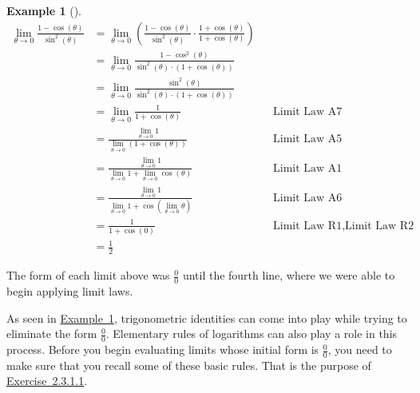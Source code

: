 \documentclass[12pt,]{book}
\theoremstyle{plain}
\theoremstyle{definition}
\theoremstyle{definition}
\theoremstyle{definition}
\newtheorem{example}[theorem]{Example}
\theoremstyle{definition}
\theoremstyle{definition}
\numberwithin{equation}{section}
\newcommand{\fe}[2]{#1\mathopen{}\left(#2\right)\mathclose{}}
\begin{document}
\begin{example}[]\label{example-second-indeterminate}
\begin{align*}
\lim_{\theta\to0}\frac{1-\fe{\cos}{\theta}}{\fe{\sin^2}{\theta}}&=\lim_{\theta\to0}\left(\frac{1-\fe{\cos}{\theta}}{\fe{\sin^2}{\theta}}\cdot\frac{1+\fe{\cos}{\theta}}{1+\fe{\cos}{\theta}}\right)\\
&=\lim_{\theta\to0}\frac{1-\fe{\cos^2}{\theta}}{\fe{\sin^2}{\theta}\cdot\left(1+\fe{\cos}{\theta}\right)}\\
&=\lim_{\theta\to0}\frac{\fe{\sin^2}{\theta}}{\fe{\sin^2}{\theta}\cdot\left(1+\fe{\cos}{\theta}\right)}\\
&=\lim_{\theta\to0}\frac{1}{1+\fe{\cos}{\theta}}&&\hyperref[lla7]{\text{Limit Law A7}}\\
&=\frac{\lim_{\theta\to0}1}{\lim_{\theta\to0}\left(1+\fe{\cos}{\theta}\right)}&&\hyperref[lla5]{\text{Limit Law A5}}\\
&=\frac{\lim_{\theta\to0}1}{\lim_{\theta\to0}1+\lim_{\theta\to0}\fe{\cos}{\theta}}&&\hyperref[lla1]{\text{Limit Law A1}}\\
&=\frac{\lim_{\theta\to0}1}{\lim_{\theta\to0}1+\fe{\cos}{\lim_{\theta\to0}\theta}}&&\hyperref[lla6]{\text{Limit Law A6}}\\
&=\frac{1}{1+\fe{\cos}{0}}&&\hyperref[llr1]{\text{Limit Law R1}}, \hyperref[llr2]{\text{Limit Law R2}}\\
&=\frac{1}{2}
\end{align*}%
\par
The form of each limit above was \(\frac{0}{0}\) until the fourth line, where we were able to begin applying limit laws.%
\end{example}
\par
As seen in \hyperref[example-second-indeterminate]{Example~\ref{example-second-indeterminate}}, trigonometric identities can come into play while trying to eliminate the form \(\frac{0}{0}\). Elementary rules of logarithms can also play a role in this process. Before you begin evaluating limits whose initial form is \(\frac{0}{0}\), you need to make sure that you recall some of these basic rules. That is the purpose of \hyperlink{exercise-identities-review}{Exercise~2.3.1.1}.%
\typeout{************************************************}
\typeout{************************************************}
\end{document}
